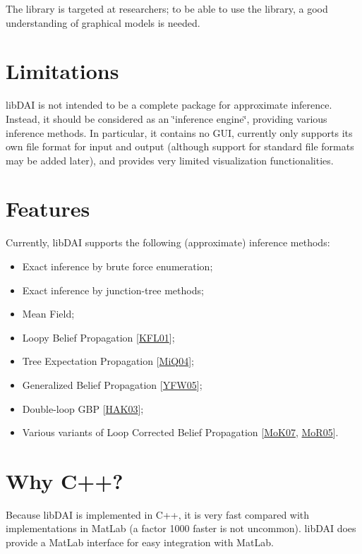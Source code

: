 The library is targeted at researchers; to be able to use the library, a good understanding of graphical models is needed.\hypertarget{index_limitations}{}\section{Limitations}\label{index_limitations}
libDAI is not intended to be a complete package for approximate inference. Instead, it should be considered as an \char`\"{}inference engine\char`\"{}, providing various inference methods. In particular, it contains no GUI, currently only supports its own file format for input and output (although support for standard file formats may be added later), and provides very limited visualization functionalities.\hypertarget{index_features}{}\section{Features}\label{index_features}
Currently, libDAI supports the following (approximate) inference methods:\begin{itemize}
\item Exact inference by brute force enumeration;\item Exact inference by junction-tree methods;\item Mean Field;\item Loopy Belief Propagation \mbox{[}\hyperlink{Bibliography_KFL01}{KFL01}\mbox{]};\item Tree Expectation Propagation \mbox{[}\hyperlink{Bibliography_MiQ04}{MiQ04}\mbox{]};\item Generalized Belief Propagation \mbox{[}\hyperlink{Bibliography_YFW05}{YFW05}\mbox{]};\item Double-loop GBP \mbox{[}\hyperlink{Bibliography_HAK03}{HAK03}\mbox{]};\item Various variants of Loop Corrected Belief Propagation \mbox{[}\hyperlink{Bibliography_MoK07}{MoK07}, \hyperlink{Bibliography_MoR05}{MoR05}\mbox{]}.\end{itemize}
\hypertarget{index_language}{}\section{Why C++?}\label{index_language}
Because libDAI is implemented in C++, it is very fast compared with implementations in MatLab (a factor 1000 faster is not uncommon). libDAI does provide a MatLab interface for easy integration with MatLab. 